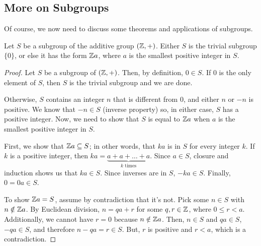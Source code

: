 \documentclass[letterpaper]{article}
\begin{document}
\subsection{More on Subgroups}
Of course, we now need to discuss some theorems and applications of subgroups. 
\begin{theorem}{}{}
    Let $S$ be a subgroup of the additive group $(\mathbb{Z}, +)$. Either $S$ is the trivial subgroup $\{0\}$, or else it has the form $\mathbb{Z} a$, where $a$ is the smallest positive integer in $S$. 
\end{theorem}

\begin{mdframed}
    \begin{proof}
        Let $S$ be a subgroup of $(\mathbb{Z}, +)$. Then, by definition, $0 \in S$. If 0 is the only element of $S$, then $S$ is the trivial subgroup and we are done. 

        \bigskip 

        Otherwise, $S$ contains an integer $n$ that is different from 0, and either $n$ or $-n$ is positive. We know that $-n \in S$ (inverse property) so, in either case, $S$ has a positive integer. Now, we need to show that $S$ is equal to $\mathbb{Z} a$ when $a$ is the smallest positive integer in $S$. 

        \bigskip 

        First, we show that $\mathbb{Z} a \subseteq S$; in other words, that $ka$ is in $S$ for every integer $k$. If $k$ is a positive integer, then $ka = \underbrace{a + a + \dots + a}_{k \text{ times}}$. Since $a \in S$, closure and induction shows us that $ka \in S$. Since inverses are in $S$, $-ka \in S$. Finally, $0 = 0a \in S$. 

        \bigskip 

        To show $\mathbb{Z} a = S$, assume by contradiction that it's not. Pick some $n \in S$ with $n \notin \mathbb{Z} a$. By Euclidean division, $n = qa + r$ for some $q, r \in \mathbb{Z}$, where $0 \leq r < a$. Additionally, we cannot have $r = 0$ because $n \notin \mathbb{Z} a$. Then, $n \in S$ and $qa \in S$, $-qa \in S$, and therefore $n - qa = r \in S$. But, $r$ is positive and $r < a$, which is a contradiction. \qedhere 

    \end{proof}
\end{mdframed}
\end{document}
